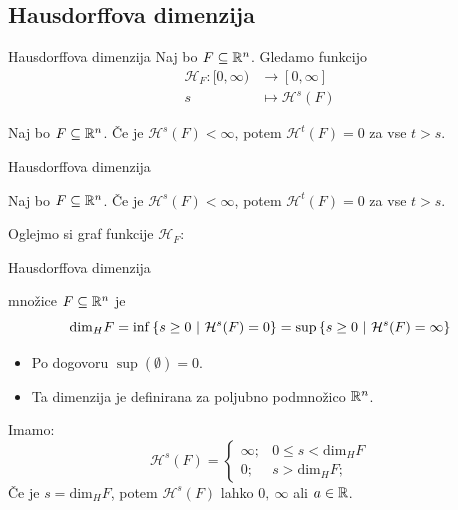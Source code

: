 \documentclass[10pt]{beamer}
\begin{document}
\subsection{Hausdorffova dimenzija}
\begin{frame}[t]{Hausdorffova dimenzija}
    Naj bo \(F \subseteq \mathbb{R}^n\). Gledamo funkcijo 
    \begin{align*}
        \mathcal{H}_F: [0, \infty) &\longrightarrow [0, \infty] \\
        s &\longmapsto \mathcal{H}^{s}(F)
    \end{align*}

    \begin{lema}
        Naj bo \(F \subseteq \mathbb{R}^n\). Če je \(\mathcal{H}^{s}(F) < \infty\), potem \(\mathcal{H}^{t}(F) = 0\) za vse \(t > s\).
    \end{lema}
\end{frame}

\begin{frame}[t]{Hausdorffova dimenzija}
    \begin{lema}
        Naj bo \(F \subseteq \mathbb{R}^n\). Če je \(\mathcal{H}^{s}(F) < \infty\), potem \(\mathcal{H}^{t}(F) = 0\) za vse \(t > s\).
    \end{lema}

    Oglejmo si graf funkcije \(\mathcal{H}_F\):
    \begin{center}
        \scalebox{0.8}{
            \drawGraf
        }        
    \end{center}    
\end{frame}

\begin{frame}[t]{Hausdorffova dimenzija}
    \begin{definicija}
         množice \(F \subseteq \mathbb{R}^n\) je 
        \[\text{dim}_H F = \inf \left\{s \geq 0 \ | \ \mathcal{H}^{s}(F) = 0\right\} = \sup \left\{s \geq 0 \ | \ \mathcal{H}^{s}(F) = \infty\right\}\]
    \end{definicija} 

    \pause
     {
        \begin{opomba}
            \begin{itemize}
                \item Po dogovoru \(\sup (\emptyset) = 0\).
                \item Ta dimenzija je definirana za poljubno podmnožico \(\mathbb{R}^n\).
            \end{itemize}   
        \end{opomba}
    }
    \pause 
    Imamo:
    \[
        \mathcal{H}^{s}(F) = \begin{cases}
            \infty; &0 \leq s < \text{dim}_H F \\ 
            0; &s > \text{dim}_H F;
        \end{cases}
    \]
    Če je \(s = \text{dim}_H F\), potem \(\mathcal{H}^{s}(F)\) lahko \(0, \  \infty\) ali \(a \in \mathbb{R}\).    
\end{frame}
\end{document}
